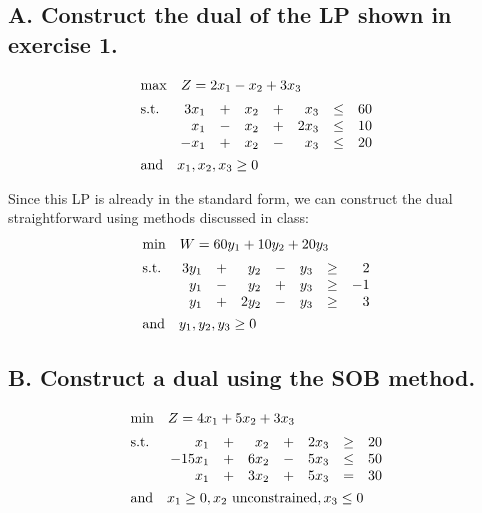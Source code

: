 \documentclass[12pt]{article}
\begin{document}
\subsection{A. Construct the dual of the LP shown in exercise 1.}
\begin{align*}
  &\mathrm{max} \quad Z = 2x_1 - x_2 + 3x_3 \\[2pt]
  &\mathrm{s.t.} \quad 
  \begin{array}[t]{r c r c r c r}
      3x_1 & + & x_2 & + & x_3 & \leq & 60 \\
      x_1 & - & x_2 & + & 2x_3 & \leq & 10 \\
      -x_1 & + & x_2 & - & x_3 & \leq & 20
  \end{array}\\
  &\mathrm{and} \quad x_1, x_2, x_3 \geq 0
\end{align*}

\noindent
Since this LP is already in the standard form, we can construct the dual straightforward using methods discussed in class:
\begin{align*}
  &\mathrm{min} \quad W = 60y_1 + 10y_2 + 20y_3 \\[2pt]
  &\mathrm{s.t.} \quad 
  \begin{array}[t]{r c r c r c r}
      3y_1 & + & y_2 & - & y_3 & \geq & 2 \\
      y_1 & - & y_2 & + & y_3 & \geq & -1 \\
      y_1 & + & 2y_2 & - & y_3 & \geq & 3
  \end{array}\\
  &\mathrm{and} \quad y_1, y_2, y_3 \geq 0
\end{align*}

\subsection{B. Construct a dual using the SOB method.}
\begin{align*}
  &\mathrm{min} \quad Z = 4x_1 + 5x_2 + 3x_3 \\[2pt]
  &\mathrm{s.t.} \quad 
  \begin{array}[t]{r c r c r c r}
      x_1 & + & x_2 & + & 2x_3 & \geq & 20 \\
      -15x_1 & + & 6x_2 & - & 5x_3 & \leq & 50 \\
      x_1 & + & 3x_2 & + & 5x_3 & = & 30
  \end{array}\\
  &\mathrm{and} \quad x_1 \geq 0, x_2 \text{ unconstrained}, x_3 \leq 0
\end{align*}
\end{document}
